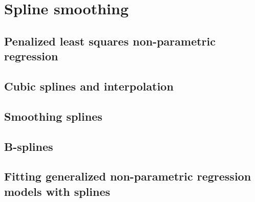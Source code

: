 \chapter{Spline smoothing}

\section{Penalized least squares non-parametric regression}
\section{Cubic splines and interpolation}
\section{Smoothing splines}
\section{B-splines}
\section{Fitting generalized non-parametric regression models with splines}

